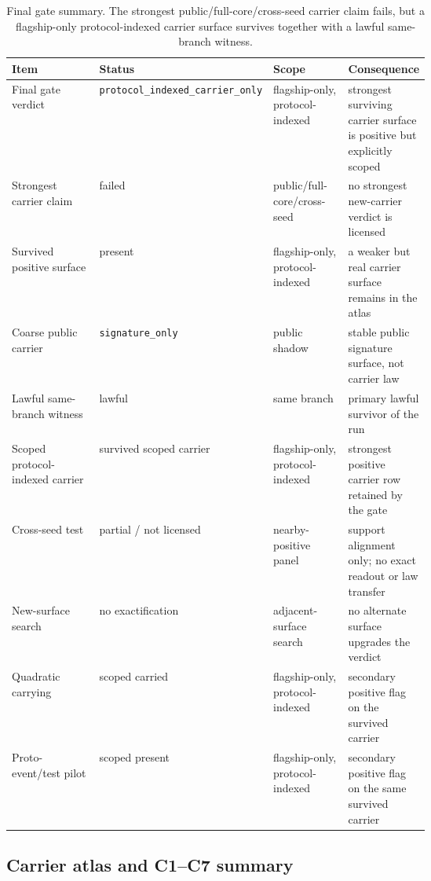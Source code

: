 \documentclass[11pt]{article}
\theoremstyle{definition}
\begin{document}
\begin{table}[t]
\centering
\footnotesize
\caption{Final gate summary. The strongest public/full-core/cross-seed carrier claim
fails, but a flagship-only protocol-indexed carrier surface survives together with a
lawful same-branch witness.}
\label{tab:final-gate-summary}
\begin{tabularx}{\linewidth}{@{}>{\raggedright\arraybackslash}p{0.24\linewidth}>{\raggedright\arraybackslash}p{0.19\linewidth}>{\raggedright\arraybackslash}p{0.19\linewidth}>{\raggedright\arraybackslash}X@{}}
\toprule
Item & Status & Scope & Consequence \\
\midrule
Final gate verdict & \nolinkurl{protocol_indexed_carrier_only} & flagship-only, protocol-indexed & strongest surviving carrier surface is positive but explicitly scoped \\
Strongest carrier claim & failed & public/full-core/cross-seed & no strongest new-carrier verdict is licensed \\
Survived positive surface & present & flagship-only, protocol-indexed & a weaker but real carrier surface remains in the atlas \\
Coarse public carrier & \texttt{signature\_only} & public shadow & stable public signature surface, not carrier law \\
Lawful same-branch witness & lawful & same branch & primary lawful survivor of the run \\
Scoped protocol-indexed carrier & survived scoped carrier & flagship-only, protocol-indexed & strongest positive carrier row retained by the gate \\
Cross-seed test & partial / not licensed & nearby-positive panel & support alignment only; no exact readout or law transfer \\
New-surface search & no exactification & adjacent-surface search & no alternate surface upgrades the verdict \\
Quadratic carrying & scoped carried & flagship-only, protocol-indexed & secondary positive flag on the survived carrier \\
Proto-event/test pilot & scoped present & flagship-only, protocol-indexed & secondary positive flag on the same survived carrier \\
\bottomrule
\end{tabularx}
\end{table}

\subsection{Carrier atlas and C1--C7 summary}
\end{document}

